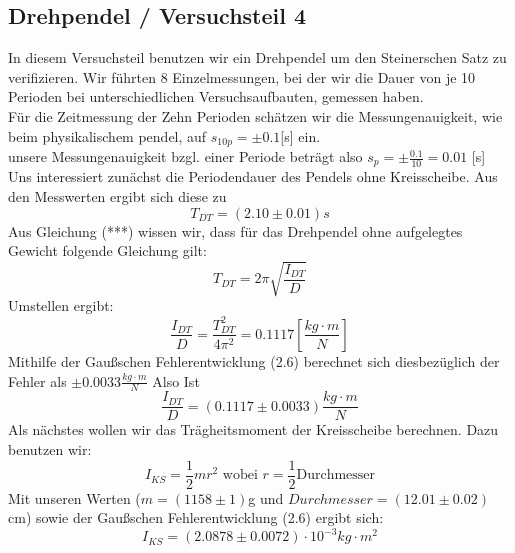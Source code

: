 \documentclass[11pt,a4paper]{article}
\begin{document}
	\subsection{Drehpendel / Versuchsteil 4}
	In diesem Versuchsteil benutzen wir ein Drehpendel um den Steinerschen Satz zu verifizieren.
	Wir führten 8 Einzelmessungen, bei der wir die  Dauer von je 10 Perioden bei unterschiedlichen Versuchsaufbauten, gemessen haben.\\
	Für die Zeitmessung der Zehn Perioden schätzen wir die Messungenauigkeit, wie beim physikalischem pendel, auf $s_{10p}=\pm 0.1$[s] ein.\\
	unsere Messungenauigkeit bzgl. einer Periode beträgt also $s_p=\pm \frac{0.1}{10} =0.01$ [s]
	\\
	Uns interessiert zunächst die Periodendauer des Pendels ohne Kreisscheibe. Aus den Messwerten
	ergibt sich diese zu $$T_{DT}=(2.10\pm 0.01)s$$
	Aus Gleichung (***) wissen wir, dass für das Drehpendel ohne aufgelegtes Gewicht folgende Gleichung gilt:
	\begin{equation}
	T_{DT}=2 \pi \sqrt{\frac{I_{DT}}{D}}
	\end{equation}
	Umstellen ergibt:
	\begin{equation}
	\frac{I_{DT}}{D} = \frac{T_{DT}^2}{4 \pi^2}=0.1117[\frac{kg\cdot m}{N}]
	\end{equation}
	Mithilfe der Gaußschen Fehlerentwicklung (2.6) berechnet sich diesbezüglich der Fehler als $\pm 0.0033
	\frac{kg \cdot m}{N}$
	Also Ist 
	\begin{equation}
	\frac{I_{DT}}{D} =(0.1117 \pm 0.0033)\frac{kg\cdot m}{N}
	\end{equation}
	Als nächstes wollen wir das Trägheitsmoment der Kreisscheibe berechnen. Dazu benutzen wir:
	\begin{equation}
	I_{KS}=\frac{1}{2}m r^2 \text{  wobei  } r=\frac{1}{2} \text{Durchmesser}
	\end{equation}
	Mit unseren Werten ($m=(1158\pm 1)$g und $Durchmesser=(12.01 \pm 0.02)$cm) sowie der Gaußschen
	Fehlerentwicklung (2.6) ergibt sich:
	\begin{equation}
	I_{KS}=(2.0878 \pm 0.0072)\cdot 10^{-3} kg \cdot m^2
	\end{equation}
\end{document}
